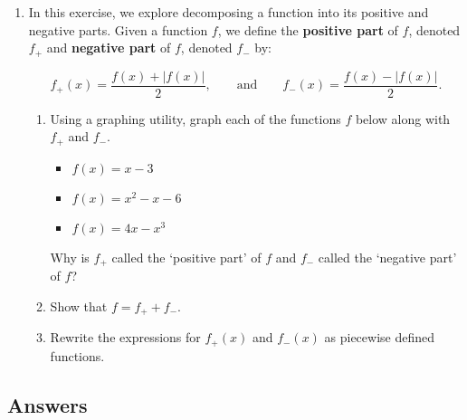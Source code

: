 \begin{enumerate}
\setcounter{enumi}{\value{HW}}

\item \label{posnegdecompexercise}  In this exercise, we explore decomposing a function into its positive and negative parts.  Given a function $f$, we define the \textbf{positive part} of $f$, denoted $f_{+}$ and \textbf{negative part} of $f$, denoted $f_{-}$ by:

\[ f_{+}(x) = \dfrac{f(x) + |f(x)|}{2}, \qquad \text{and} \qquad f_{-}(x) = \dfrac{f(x) - |f(x)|}{2}. \]

\begin{enumerate}

\item Using a graphing utility, graph each of the functions $f$ below along with $f_{+}$ and $f_{-}$.

\begin{multicols}{3}

\begin{itemize}

\item  $f(x) = x-3$

\item  $f(x) = x^2-x-6$

\item  $f(x) = 4x-x^3$

\end{itemize}

\end{multicols}

Why is $f_{+}$ called the `positive part' of $f$ and $f_{-}$ called the `negative part' of $f$?

\item Show that $f = f_{+} + f_{-}$.

\item {}Rewrite the expressions for $f_{+}(x)$ and $f_{-}(x)$ as piecewise defined functions.

\end{enumerate}  

\setcounter{HW}{\value{enumi}}
\end{enumerate}

\newpage

\subsection{Answers}


